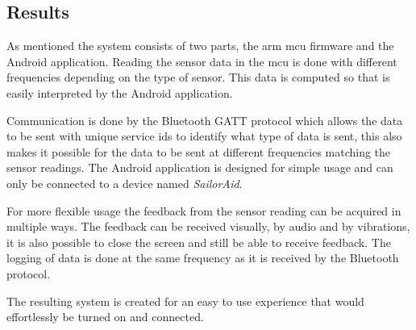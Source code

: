 \subsection{Results}
As mentioned the system consists of two parts, the \gls{arm} \gls{mcu} firmware and the Android application.
Reading the sensor data in the \gls{mcu} is done with different frequencies depending on the type of sensor.
This data is computed so that is easily interpreted by the Android application.

Communication is done by the Bluetooth GATT protocol which allows the data to be sent with unique service ids to identify what type of data is sent, this also makes it possible for the data to be sent at different frequencies matching the sensor readings.
The Android application is designed for simple usage and can only be connected to a device named \emph{SailorAid}.

For more flexible usage the feedback from the sensor reading can be acquired in multiple ways.
The feedback can be received visually, by audio and by vibrations, it is also possible to close the screen and still be able to receive feedback.
The logging of data is done at the same frequency as it is received by the Bluetooth protocol.

The resulting system is created for an easy to use experience that would effortlessly be turned on and connected.
